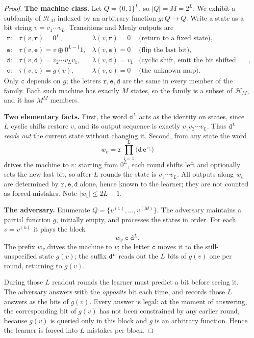 \documentclass[12pt]{article}
\theoremstyle{definition}
\begin{document}
\begin{proof}
\textbf{The machine class.}
Let $Q=\{0,1\}^L$, so $|Q|=M=2^L$.  We exhibit a subfamily of $\mathcal H_M$
indexed by an arbitrary function $g:Q\to Q$.  Write a state as a bit string
$v=v_1\cdots v_L$.  Transitions and Mealy outputs are
\[
\begin{array}{llll}
\mathtt r:&\tau(v,\mathtt r)=0^L, &\lambda(v,\mathtt r)=0
&\text{(return to a fixed state)},\\[2pt]
\mathtt e:&\tau(v,\mathtt e)=v\oplus 0^{L-1}1, &\lambda(v,\mathtt e)=0
&\text{(flip the last bit)},\\[2pt]
\mathtt d:&\tau(v,\mathtt d)=v_2\cdots v_Lv_1, &\lambda(v,\mathtt d)=v_1
&\text{(cyclic shift, emit the bit shifted out)},\\[2pt]
\mathtt c:&\tau(v,\mathtt c)=g(v), &\lambda(v,\mathtt c)=0
&\text{(the unknown map)}.
\end{array}
\]
Only $\mathtt c$ depends on $g$; the letters $\mathtt r,\mathtt e,\mathtt d$
are the same in every member of the family.  Each such machine has exactly $M$
states, so the family is a subset of $\mathcal H_M$, and it has $M^M$ members.

\textbf{Two elementary facts.}
First, the word $\mathtt d^L$ acts as the identity on states, since $L$ cyclic
shifts restore $v$, and its output sequence is exactly $v_1v_2\cdots v_L$.
Thus $\mathtt d^L$ \emph{reads out} the current state without changing it.
Second, from any state the word
\[
w_v
=
\mathtt r\,
\prod_{i=1}^{L}\bigl(\mathtt d\,\mathtt e^{\,v_i}\bigr)
\]
drives the machine to $v$: starting from $0^L$, each round shifts left and
optionally sets the new last bit, so after $L$ rounds the state is
$v_1\cdots v_L$.  All outputs along $w_v$ are determined by
$\mathtt r,\mathtt e,\mathtt d$ alone, hence known to the learner; they are not
counted as forced mistakes.  Note $|w_v|\le 2L+1$.

\textbf{The adversary.}
Enumerate $Q=\{v^{(1)},\dots,v^{(M)}\}$.  The adversary maintains a partial
function $g$, initially empty, and processes the states in order.  For each
$v=v^{(k)}$ it plays the block
\[
w_v\;\mathtt c\;\mathtt d^L .
\]
The prefix $w_v$ drives the machine to $v$; the letter $\mathtt c$ moves it to
the still-unspecified state $g(v)$; the suffix $\mathtt d^L$ reads out the $L$
bits of $g(v)$ one per round, returning to $g(v)$.

During those $L$ readout rounds the learner must predict a bit before seeing
it.  The adversary answers with the \emph{opposite} bit each time, and records
those $L$ answers as the bits of $g(v)$.  Every answer is legal: at the moment
of answering, the corresponding bit of $g(v)$ has not been constrained by any
earlier round, because $g(v)$ is queried only in this block and $g$ is an
arbitrary function.  Hence the learner is forced into $L$ mistakes per block.


\end{proof}
\end{document}
